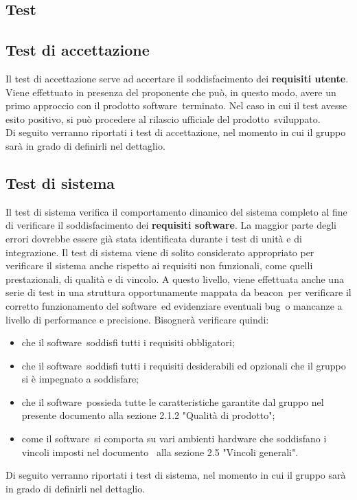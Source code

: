 \documentclass[../PianoDiQualifica.tex]{subfiles}
\begin{document}
\begin{appendices}

\section{Test}
	\subsection{Test di accettazione}
	Il test di accettazione serve ad accertare il soddisfacimento dei \textbf{requisiti utente}. Viene effettuato in presenza del proponente che può, in questo modo, avere un primo approccio con il prodotto software\g\ terminato. Nel caso in cui il test avesse esito positivo, si può procedere al rilascio ufficiale del prodotto\g\ 
sviluppato.\\
	Di seguito verranno riportati i test di accettazione, nel momento in cui il gruppo sarà in grado di definirli nel dettaglio.
	\subsection{Test di sistema}
	Il test di sistema verifica il comportamento dinamico del sistema completo al fine di verificare il soddisfacimento dei \textbf{requisiti software}. La maggior parte degli errori dovrebbe essere già stata identificata durante i test di unità e di integrazione. Il test di sistema viene di solito considerato appropriato per verificare il sistema anche rispetto ai requisiti non funzionali, come quelli prestazionali, di qualità e di vincolo. A questo livello, viene effettuata anche una serie di test in una struttura opportunamente mappata da beacon\g\ per verificare il corretto funzionamento del software\g\ ed evidenziare eventuali bug\g\ o mancanze a livello di performance e precisione. Bisognerà verificare quindi:
	\begin{itemize}
		\item che il software\g\ soddisfi tutti i requisiti obbligatori;
		\item che il software\g\ soddisfi tutti i requisiti desiderabili ed opzionali che il gruppo si è impegnato a soddisfare;
		\item che il software\g\ possieda tutte le caratteristiche garantite dal gruppo nel presente documento alla sezione 2.1.2 "Qualità di prodotto";
		\item come il software\g\ si comporta su vari ambienti hardware che soddisfano i vincoli imposti nel documento \analisideirequisiti\ alla sezione 2.5 "Vincoli generali".
	\end{itemize}
	Di seguito verranno riportati i test di sistema, nel momento in cui il gruppo sarà in grado di definirli nel dettaglio.
\end{appendices}
\end{document}
